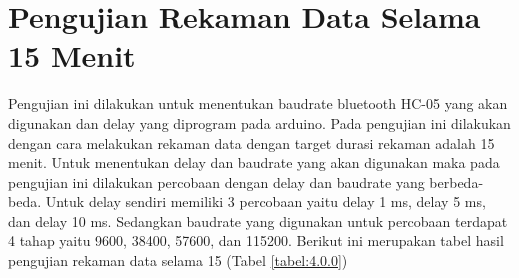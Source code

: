 \section{Pengujian Rekaman Data Selama 15 Menit}
\vspace{1ex}
Pengujian ini dilakukan untuk menentukan baudrate bluetooth HC-05 yang akan digunakan dan delay yang diprogram pada arduino. Pada pengujian ini dilakukan dengan cara melakukan rekaman data dengan target durasi rekaman adalah 15 menit. Untuk menentukan delay dan baudrate yang akan digunakan maka pada pengujian ini dilakukan percobaan dengan delay dan baudrate yang berbeda-beda. Untuk delay sendiri memiliki 3 percobaan yaitu delay 1 ms, delay 5 ms, dan delay 10 ms. Sedangkan baudrate yang digunakan untuk percobaan terdapat 4 tahap yaitu 9600, 38400, 57600, dan 115200. Berikut ini merupakan tabel hasil pengujian rekaman data selama 15 (Tabel \ref{tabel:4.0.0})
